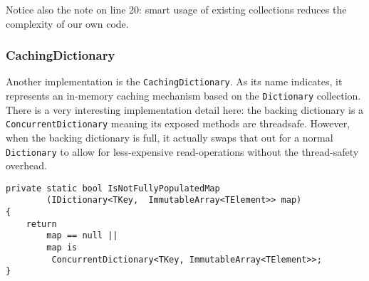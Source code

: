 Notice also the note on line 20: smart usage of existing collections reduces the complexity of our own code.

\subsubsection{CachingDictionary}
\label{sec:spec-coll-cachingdictionary}

Another implementation is the \texttt{CachingDictionary}. As its name indicates, it represents an in-memory caching mechanism based on the \texttt{Dictionary} collection. There is a very interesting implementation detail here: the backing dictionary is a \texttt{ConcurrentDictionary} meaning its exposed methods are \gls{threadsafe}. However, when the backing dictionary is full, it actually swaps that out for a normal \texttt{Dictionary} to allow for less-expensive read-operations without the thread-safety overhead.

\begin{lstlisting}
private static bool IsNotFullyPopulatedMap
		(IDictionary<TKey,	ImmutableArray<TElement>> map)
{
	return 
		map == null || 
		map is 
		 ConcurrentDictionary<TKey, ImmutableArray<TElement>>;
}
\end{lstlisting}